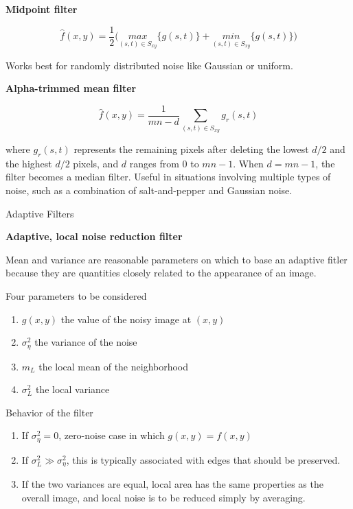 \documentclass[]{article}
\begin{document}
\textbf{Midpoint filter}

\[\hat{f}(x,y)=\dfrac{1}{2}\Bigg(\underset{(s,t)\in S_{xy}}{max}\{g(s,t)\}+\underset{(s,t)\in S_{xy}}{min}\{g(s,t)\}\Bigg)\]

Works best for randomly distributed noise like Gaussian or uniform.

\textbf{Alpha-trimmed mean filter}

\[\hat{f}(x,y)=\dfrac{1}{mn-d}\sum\limits_{(s,t)\in S_{xy}}g_r(s,t)\]

where \(g_r(s,t)\) represents the remaining pixels after deleting the
lowest \(d/2\) and the highest \(d/2\) pixels, and \(d\) ranges from
\(0\) to \(mn-1\). When \(d=mn-1\), the filter becomes a median filter.
Useful in situations involving multiple types of noise, such as a
combination of salt-and-pepper and Gaussian noise.

Adaptive Filters

\textbf{Adaptive, local noise reduction filter}

Mean and variance are reasonable parameters on which to base an adaptive
fitler because they are quantities closely related to the appearance of
an image.

Four parameters to be considered\\

\begin{enumerate}
\def\labelenumi{\arabic{enumi}.}
\item
  \(g(x,y)\) the value of the noisy image at \((x,y)\)
\item
  \(\sigma^2_{\eta}\) the variance of the noise
\item
  \(m_L\) the local mean of the neighborhood
\item
  \(\sigma_L^2\) the local variance
\end{enumerate}

Behavior of the filter\\

\begin{enumerate}
\def\labelenumi{\arabic{enumi}.}
\item
  If \(\sigma_\eta^2=0\), zero-noise case in which \(g(x,y)=f(x,y)\) 
\item
  If \(\sigma_L^2 \gg \sigma_\eta^2\), this is typically associated with
  edges that should be preserved.
\item
  If the two variances are equal, local area has the same properties as
  the overall image, and local noise is to be reduced simply by
  averaging. 
\end{enumerate}
\end{document}
